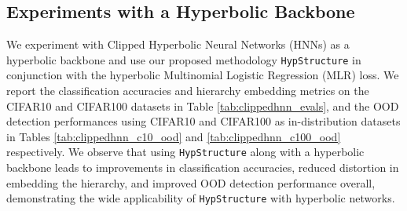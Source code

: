 \begin{table}[ht]
\caption{Results on ImageNet100 when using the \texttt{HypSupCon}\citep{ge2022hyperbolic} as $\ell_\text{Flat}$ using ResNet-34 as the backbone. Training with \texttt{HypStructure} achieves improvements in OOD detection performance.}
\centering
{}
\label{tab:hypsupcon_im10_ood}
\end{table}






\subsection{Experiments with a Hyperbolic Backbone}
\label{app:sec_clippedhnn}

We experiment with Clipped Hyperbolic Neural Networks (HNNs) \citep{guo2022clipped} as a hyperbolic backbone and use our proposed methodology \texttt{HypStructure} in conjunction with the hyperbolic Multinomial Logistic Regression (MLR) loss. We report the classification accuracies and hierarchy embedding metrics on the CIFAR10 and CIFAR100 datasets in Table \ref{tab:clippedhnn_evals}, and the OOD detection performances using CIFAR10 and CIFAR100 as in-distribution datasets in Tables \ref{tab:clippedhnn_c10_ood} and \ref{tab:clippedhnn_c100_ood} respectively. We observe that using \texttt{HypStructure} along with a hyperbolic backbone leads to improvements in classification accuracies, reduced distortion in embedding the hierarchy, and improved OOD detection performance overall, demonstrating the wide applicability of \texttt{HypStructure} with hyperbolic networks. 


